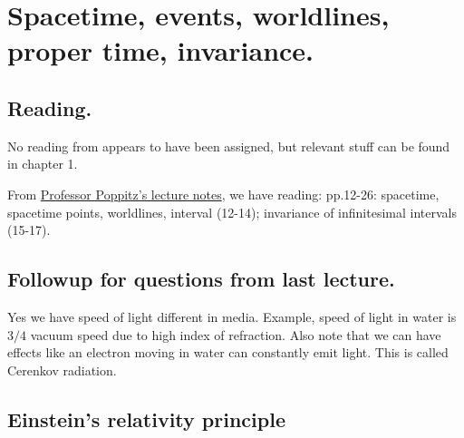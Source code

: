 %
%

\chapter{Spacetime, events, worldlines, proper time, invariance.}
\label{chap:relativisticElectrodynamicsL2}
{}
\date{Jan 12, 2011}

\beginArtNoToc

\section{Reading.}

No reading from \citep{landau1980classical} appears to have been assigned, but relevant stuff can be found in chapter 1.

From \href{http://www.physics.utoronto.ca/~poppitz/epoppitz/PHY450_files/RelEM12-26.pdf}{Professor Poppitz's lecture notes}, we have reading: pp.12-26: spacetime, spacetime points, worldlines, interval (12-14); invariance of infinitesimal intervals (15-17).

\section{Followup for questions from last lecture.}

Yes we have speed of light different in media.  Example, speed of light in water is $3/4$ vacuum speed due to high index of refraction.  Also note that we can have effects like an electron moving in water can constantly emit light.  This is called Cerenkov radiation.

\section{Einstein's relativity principle}

